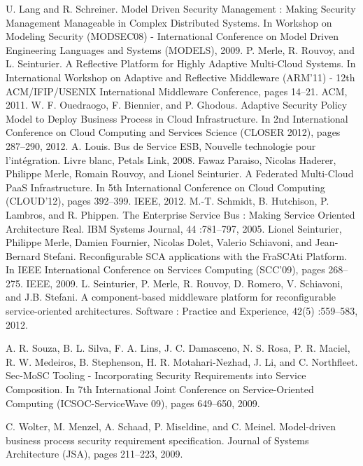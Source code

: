 \documentclass[runningheads,a4paper]{llncs}
\begin{document}
\begin{thebibliography}{4}

 U. Lang and R. Schreiner. Model Driven Security Management : Making
Security Management Manageable in Complex Distributed Systems. In Workshop on Modeling Security (MODSEC08) - International Conference on Model
Driven Engineering Languages and Systems (MODELS), 2009.
 P. Merle, R. Rouvoy, and L. Seinturier. A Reflective Platform for Highly Adaptive Multi-Cloud Systems. In International Workshop
on Adaptive and Reflective Middleware (ARM’11) - 12th ACM/IFIP/USENIX
International Middleware Conference, pages 14–21. ACM, 2011.
 W. F. Ouedraogo, F. Biennier, and P. Ghodous.
Adaptive Security Policy Model to Deploy Business Process in Cloud Infrastructure. In 2nd International Conference on Cloud Computing and Services Science (CLOSER 2012), pages 287–290, 2012.
 A. Louis. Bus de Service ESB, Nouvelle technologie pour l’int\'egration. Livre
blanc, Petals Link, 2008.
 Fawaz Paraiso, Nicolas Haderer, Philippe Merle, Romain Rouvoy, and Lionel
Seinturier. A Federated Multi-Cloud PaaS Infrastructure. In 5th International
Conference on Cloud Computing (CLOUD’12), pages 392–399. IEEE, 2012.
 M.-T. Schmidt, B. Hutchison, P. Lambros, and R. Phippen. The Enterprise
Service Bus : Making Service Oriented Architecture Real. IBM Systems Journal, 44 :781–797, 2005.
Lionel Seinturier, Philippe Merle, Damien Fournier, Nicolas Dolet, Valerio
Schiavoni, and Jean-Bernard Stefani. Reconfigurable SCA applications with
the FraSCAti Platform. In IEEE International Conference on Services Computing (SCC’09), pages 268–275. IEEE, 2009.
L. Seinturier, P. Merle, R. Rouvoy, D. Romero, V. Schiavoni, and J.B. Stefani. A component-based middleware platform for reconfigurable service-oriented architectures. Software : Practice and Experience, 42(5) :559–583, 2012.

A. R. Souza, B. L. Silva, F. A. Lins, J. C. Damasceno, N. S. Rosa, P. R. Maciel,
R. W. Medeiros, B. Stephenson, H. R. Motahari-Nezhad, J. Li, and C. Northfleet. Sec-MoSC Tooling - Incorporating Security Requirements into Service Composition. In 7th International Joint Conference on Service-Oriented Computing (ICSOC-ServiceWave 09), pages 649–650, 2009.

C. Wolter, M. Menzel, A. Schaad, P. Miseldine, and C. Meinel. Model-driven business process security requirement specification. Journal of Systems Architecture (JSA), pages 211–223, 2009.


\end{thebibliography}
\end{document}
